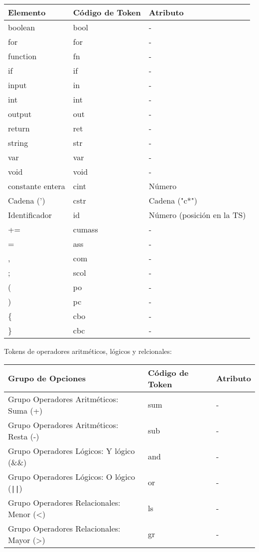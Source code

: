 \documentclass{article}
\begin{document}
\begin{table}[h!]
    \centering
    \begin{tabular}{|l|l|l|}
        \hline
		\rowcolor{gray!20} %
        \textbf{Elemento} & \textbf{Código de Token} & \textbf{Atributo} \\ \hline
        boolean & bool & - \\ \hline
        for & for & - \\ \hline
        function & fn & - \\ \hline
        if & if & - \\ \hline
        input & in & - \\ \hline
        int & int & - \\ \hline
        output & out & - \\ \hline
        return & ret & - \\ \hline
        string & str & - \\ \hline
        var & var & - \\ \hline
        void & void & - \\ \hline
        constante entera & cint & Número \\ \hline
        Cadena (') & cstr & Cadena ("c*") \\ \hline
		Identificador & id & Número (posición en la TS) \\ \hline
        += & cumass & - \\ \hline
        = & ass & - \\ \hline
        , & com & - \\ \hline
        ; & scol & - \\ \hline
        ( & po & - \\ \hline
        ) & pc & - \\ \hline
        \{ & cbo & - \\ \hline
        \} & cbc & - \\ \hline
    \end{tabular}
\end{table}

Tokens de operadores aritméticos, lógicos y relcionales:
\begin{table}[h!]
    \centering
    \begin{tabular}{|l|l|l|}
        \hline
		\rowcolor{gray!20} %
        \textbf{Grupo de Opciones} & \textbf{Código de Token} & \textbf{Atributo} \\ \hline
        Grupo Operadores Aritméticos: Suma (+) & sum & - \\ \hline
        Grupo Operadores Aritméticos: Resta (-) & sub & - \\ \hline
        Grupo Operadores Lógicos: Y lógico (\&\&) & and & - \\ \hline
        Grupo Operadores Lógicos: O lógico (\texttt{||}) & or & - \\ \hline
        Grupo Operadores Relacionales: Menor (<) & ls & - \\ \hline
        Grupo Operadores Relacionales: Mayor (>) & gr & - \\ \hline
    \end{tabular}
\end{table}
\end{document}
